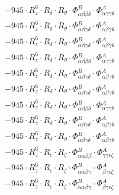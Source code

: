 \documentclass{article}
\begin{document}
\begin{subequations}
\begin{gather}
\begin{array}{c}
 \\[0.2em] 		 - 945 \cdot R_{z}^{6} \cdot R_{\delta{}} \cdot R_{\theta{}} \cdot \Phi{}^{B}_{\alpha{}\beta{}\beta{}\delta{}} \cdot \Phi{}^{A}_{\alpha{}\gamma{}\gamma{}\theta{}} 
 \\[0.2em] 		 - 945 \cdot R_{z}^{6} \cdot R_{\delta{}} \cdot R_{\theta{}} \cdot \Phi{}^{B}_{\alpha{}\beta{}\gamma{}\delta{}} \cdot \Phi{}^{A}_{\alpha{}\beta{}\gamma{}\theta{}} 
 \\[0.2em] 		 - 945 \cdot R_{z}^{6} \cdot R_{\delta{}} \cdot R_{\theta{}} \cdot \Phi{}^{B}_{\alpha{}\beta{}\gamma{}\delta{}} \cdot \Phi{}^{A}_{\alpha{}\beta{}\gamma{}\theta{}} 
 \\[0.2em] 		 - 945 \cdot R_{z}^{6} \cdot R_{\delta{}} \cdot R_{\theta{}} \cdot \Phi{}^{B}_{\alpha{}\beta{}\beta{}\delta{}} \cdot \Phi{}^{A}_{\alpha{}\gamma{}\gamma{}\theta{}} 
 \\[0.2em] 		 - 945 \cdot R_{z}^{6} \cdot R_{\delta{}} \cdot R_{\theta{}} \cdot \Phi{}^{B}_{\alpha{}\beta{}\gamma{}\delta{}} \cdot \Phi{}^{A}_{\alpha{}\beta{}\gamma{}\theta{}} 
 \\[0.2em] 		 - 945 \cdot R_{z}^{6} \cdot R_{\delta{}} \cdot R_{\theta{}} \cdot \Phi{}^{B}_{\alpha{}\beta{}\gamma{}\delta{}} \cdot \Phi{}^{A}_{\alpha{}\beta{}\gamma{}\theta{}} 
 \\[0.2em] 		 - 945 \cdot R_{z}^{6} \cdot R_{\delta{}} \cdot R_{\theta{}} \cdot \Phi{}^{B}_{\alpha{}\beta{}\beta{}\delta{}} \cdot \Phi{}^{A}_{\alpha{}\gamma{}\gamma{}\theta{}} 
 \\[0.2em] 		 - 945 \cdot R_{z}^{6} \cdot R_{\delta{}} \cdot R_{\theta{}} \cdot \Phi{}^{B}_{\alpha{}\beta{}\gamma{}\delta{}} \cdot \Phi{}^{A}_{\alpha{}\beta{}\gamma{}\theta{}} 
 \\[0.2em] 		 - 945 \cdot R_{z}^{6} \cdot R_{\delta{}} \cdot R_{\theta{}} \cdot \Phi{}^{B}_{\alpha{}\beta{}\gamma{}\delta{}} \cdot \Phi{}^{A}_{\alpha{}\beta{}\gamma{}\theta{}} 
 \\[0.2em] 		 - 945 \cdot R_{z}^{6} \cdot R_{\epsilon{}} \cdot R_{\zeta{}} \cdot \Phi{}^{B}_{\alpha{}\alpha{}\beta{}\beta{}} \cdot \Phi{}^{A}_{\gamma{}\gamma{}\epsilon{}\zeta{}} 
 \\[0.2em] 		 - 945 \cdot R_{z}^{6} \cdot R_{\epsilon{}} \cdot R_{\zeta{}} \cdot \Phi{}^{B}_{\alpha{}\alpha{}\beta{}\gamma{}} \cdot \Phi{}^{A}_{\beta{}\gamma{}\epsilon{}\zeta{}} 
 \\[0.2em] 		 - 945 \cdot R_{z}^{6} \cdot R_{\epsilon{}} \cdot R_{\zeta{}} \cdot \Phi{}^{B}_{\alpha{}\alpha{}\beta{}\gamma{}} \cdot \Phi{}^{A}_{\beta{}\gamma{}\epsilon{}\zeta{}} 

\end{array}
\end{gather}
\end{subequations}
\end{document}
